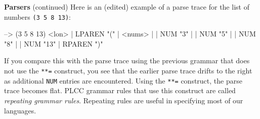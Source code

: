 \begin{minipage}[t]{\sw}
\slidenumber
\LARGE
{\bf Parsers} (continued)\exx
\Large
\emm\LightBox{\MYlonGrammarKleene}\exx
\LARGE
Here is an (edited) example
of a parse trace for the list of numbers \verb'(3 5 8 13)':
\begin{qv}
--> (3 5 8 13)
<lon>
| LPAREN "("
| <nums>
| | NUM "3"
| | NUM "5"
| | NUM "8"
| | NUM "13"
| RPAREN ")"
\end{qv}
If you compare this with the parse trace using the previous grammar
that does not use the \verb'**=' construct,
you see that the earlier parse trace drifts to the right
as additional \verb'NUM' entries are encountered.
Using the \verb'**=' construct,
the parse trace becomes flat.\exx
PLCC grammar rules that use this construct
are called {\em repeating grammar rules}.
Repeating rules are useful in specifying most of our languages.
\end{minipage}
\clearpage

